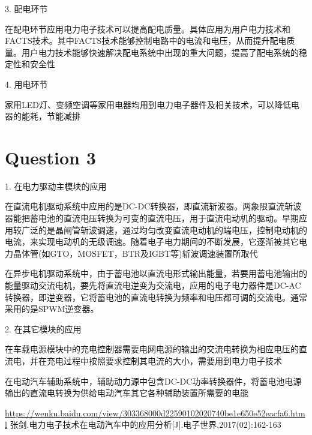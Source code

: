 \documentclass[a4paper]{article}
\begin{document}
3. 配电环节

在配电环节应用电力电子技术可以提高配电质量。具体应用为用户电力技术和FACTS技术。其中FACTS技术能够控制电路中的电流和电压，从而提升配电质量。用户电力技术能够快速解决配电系统中出现的重大问题，提高了配电系统的稳定性和安全性

4. 用电环节

家用LED灯、变频空调等家用电器均用到电力电子器件及相关技术，可以降低电器的能耗，节能减排

\section{Question 3}

1. 在电力驱动主模块的应用 \cite{ref2}

在直流电机驱动系统中应用的是DC-DC转换器，即直流斩波器。两象限直流斩波器能把蓄电池的直流电压转换为可变的直流电压，用于直流电动机的驱动。早期应用较广泛的是晶闸管斩波调速，通过均匀改变直流电动机的端电压，控制电动机的电流，来实现电动机的无级调速。随着电子电力期间的不断发展，它逐渐被其它电力晶体管(如GTO，MOSFET，BTR及IGBT等)斩波调速装置所取代

在异步电机驱动系统中，由于蓄电池以直流电形式输出能量，若要用蓄电池输出的能量驱动交流电机，要先将直流电逆变为交流电，应用的电子电力器件是DC-AC转换器，即逆变器，它将蓄电池的直流电转换为频率和电压都可调的交流电。通常采用的是SPWM逆变器。

2. 在其它模块的应用

在车载电源模块中的充电控制器需要电网电源的输出的交流电转换为相应电压的直流电，并在充电过程中按照要求控制其电流的大小，需要用到电力电子技术

在电动汽车辅助系统中，辅助动力源中包含DC-DC功率转换器件，将蓄电池电源输出的直流电转换为供给电动汽车其它各种辅助装置所需要的电能

\begin{thebibliography}{99}
     \url{https://wenku.baidu.com/view/303368000d22590102020740be1e650e52eacfa6.html}
     张剑.电力电子技术在电动汽车中的应用分析[J].电子世界,2017(02):162-163
\end{thebibliography}
\end{document}
